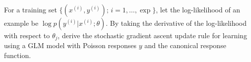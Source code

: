 \item {} For a training set
$\{(x^{(i)}, y^{(i)});\, i=1,\ldots,\exp\}$, let the log-likelihood of an example
be $\log p(y^{(i)} | x^{(i)}; \theta)$. By taking the derivative of the
log-likelihood with respect to $\theta_j$, derive the stochastic gradient
ascent update rule for learning using a GLM model with Poisson responses $y$
and the canonical response function.
